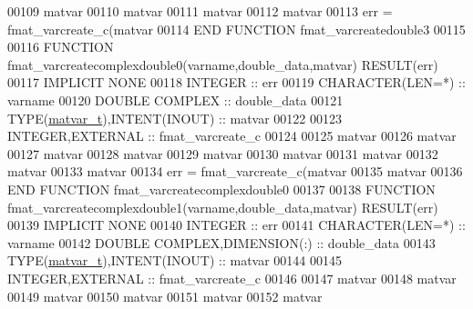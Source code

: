 \begin{DoxyCode}
00109     matvar%
00110     matvar%
00111     matvar%
00112     matvar%
00113     err = fmat\_varcreate\_c(matvar%
00114 \textcolor{keyword}{END FUNCTION }fmat\_varcreatedouble3
00115 
00116 \textcolor{keyword}{FUNCTION }fmat\_varcreatecomplexdouble0(varname,double\_data,matvar) \textcolor{keyword}{RESULT}(err)
00117 \textcolor{keywordtype}{IMPLICIT NONE}
00118     \textcolor{keywordtype}{INTEGER}                         :: err
00119     \textcolor{keywordtype}{CHARACTER(LEN=*)}                :: varname
00120     \textcolor{keywordtype}{DOUBLE COMPLEX}                  :: double\_data
00121     \textcolor{keywordtype}{TYPE}(\hyperlink{group___m_a_t_structmatvar__t}{matvar\_t}),\textcolor{keywordtype}{INTENT(INOUT)}    :: matvar
00122 
00123     \textcolor{keywordtype}{INTEGER},\textcolor{keywordtype}{EXTERNAL}                :: fmat\_varcreate\_c
00124 
00125     matvar%
00126     matvar%
00127     matvar%
00128     matvar%
00129     matvar%
00130     matvar%
00131     matvar%
00132     matvar%
00133     matvar%
00134     err = fmat\_varcreate\_c(matvar%
00135                            matvar%
00136 \textcolor{keyword}{END FUNCTION }fmat\_varcreatecomplexdouble0
00137 
00138 \textcolor{keyword}{FUNCTION }fmat\_varcreatecomplexdouble1(varname,double\_data,matvar) \textcolor{keyword}{RESULT}(err)
00139 \textcolor{keywordtype}{IMPLICIT NONE}
00140     \textcolor{keywordtype}{INTEGER}                         :: err
00141     \textcolor{keywordtype}{CHARACTER(LEN=*)}                :: varname
00142     \textcolor{keywordtype}{DOUBLE COMPLEX},\textcolor{keywordtype}{DIMENSION(:)}   :: double\_data
00143     \textcolor{keywordtype}{TYPE}(\hyperlink{group___m_a_t_structmatvar__t}{matvar\_t}),\textcolor{keywordtype}{INTENT(INOUT)}    :: matvar
00144 
00145     \textcolor{keywordtype}{INTEGER},\textcolor{keywordtype}{EXTERNAL}                :: fmat\_varcreate\_c
00146 
00147     matvar%
00148     matvar%
00149     matvar%
00150     matvar%
00151     matvar%
00152     matvar%

\end{DoxyCode}
